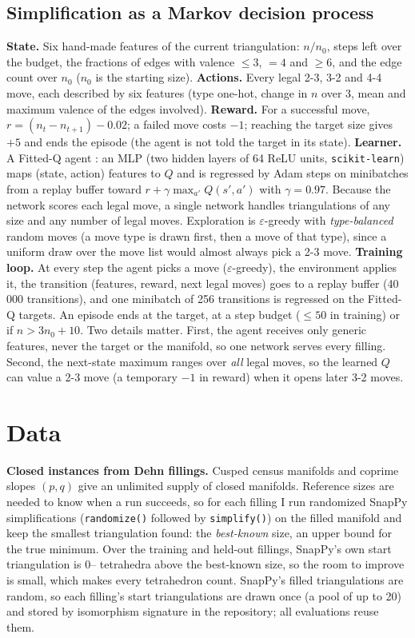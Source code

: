\documentclass[10pt,a4paper]{article}
\newcommand{\eps}{\varepsilon}
\begin{document}
\subsection{Simplification as a Markov decision process}
\textbf{State.} Six hand-made features of the current triangulation: $n/n_0$, steps left over the budget, the fractions of edges with valence $\le3$, $=4$ and $\ge6$, and the edge count over $n_0$ ($n_0$ is the starting size).
\textbf{Actions.} Every legal 2-3, 3-2 and 4-4 move, each described by six features (type one-hot, change in $n$ over 3, mean and maximum valence of the edges involved).
\textbf{Reward.} For a successful move, $r=(n_t-n_{t+1})-0.02$; a failed move costs $-1$; reaching the target size gives $+5$ and ends the episode (the agent is not told the target in its state).
\textbf{Learner.} A Fitted-Q agent \cite{nfq}: an MLP (two hidden layers of 64 ReLU units, \texttt{scikit-learn}) maps (state, action) features to $Q$ and is regressed by Adam steps on minibatches from a replay buffer toward $r+\gamma\max_{a'}Q(s',a')$ with $\gamma=0.97$.
Because the network scores each legal move, a single network handles triangulations of any size and any number of legal moves.
Exploration is $\eps$-greedy with \emph{type-balanced} random moves (a move type is drawn first, then a move of that type), since a uniform draw over the move list would almost always pick a 2-3 move.
\textbf{Training loop.} At every step the agent picks a move ($\eps$-greedy), the environment applies it, the transition (features, reward, next legal moves) goes to a replay buffer (40\,000 transitions), and one minibatch of 256 transitions is regressed on the Fitted-Q targets. An episode ends at the target, at a step budget ($\le 50$ in training) or if $n>3n_0+10$.
Two details matter. First, the agent receives only generic features, never the target or the manifold, so one network serves every filling. Second, the next-state maximum ranges over \emph{all} legal moves, so the learned $Q$ can value a 2-3 move (a temporary $-1$ in reward) when it opens later 3-2 moves.

\section{Data}
\textbf{Closed instances from Dehn fillings.} Cusped census manifolds and coprime slopes $(p,q)$ give an unlimited supply of closed manifolds. Reference sizes are needed to know when a run succeeds, so for each filling I run \restarts{} randomized SnapPy simplifications
(\texttt{randomize()} followed by \texttt{simplify()}) on the filled manifold and keep the smallest triangulation found: the \emph{best-known} size, an upper bound for the true minimum. Over the \nTrainInst{} training and \nHeldInst{} held-out fillings, SnapPy's own start triangulation is 0--\gapMax{} tetrahedra above the best-known size, so the room to improve is small, which makes every tetrahedron count.
SnapPy's filled triangulations are random, so each filling's start triangulations are drawn once (a pool of up to 20) and stored by isomorphism signature in the repository; all evaluations reuse them.
\end{document}
